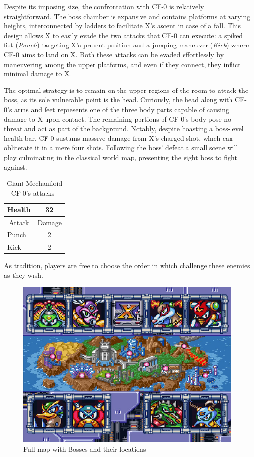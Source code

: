 Despite its imposing size, the confrontation with CF-0 is relatively straightforward. The boss chamber is expansive and contains platforms at varying heights, interconnected by ladders to facilitate X's ascent in case of a fall. This design allows X to easily evade the two attacks that CF-0 can execute: a spiked fist (\emph{Punch}) targeting X's present position and a jumping maneuver (\emph{Kick}) where CF-0 aims to land on X. Both these attacks can be evaded effortlessly by maneuvering among the upper platforms, and even if they connect, they inflict minimal damage to X.

The optimal strategy is to remain on the upper regions of the room to attack the boss, as its sole vulnerable point is the head. Curiously, the head along with CF-0's arms and feet represents one of the three body parts capable of causing damage to X upon contact. The remaining portions of CF-0's body pose no threat and act as part of the background. Notably, despite boasting a boss-level health bar, CF-0 sustains massive damage from X's charged shot, which can obliterate it in a mere four shots. Following the boss' defeat a small scene will play culminating in the classical world map, presenting the eight boss to fight against.

\begin{table}[htp]
	\centering
	\begin{tabular}[h]{l c}
		\toprule
		\multicolumn{1}{c}{Health}  & 32\\
		\midrule
		\multicolumn{1}{c}{Attack} & \multicolumn{1}{c}{Damage}\\
		Punch & 2 \\
		Kick & 2 \\
		\bottomrule
	\end{tabular}
	\caption{Giant Mechaniloid CF-0's attacks~\cite{wiki:CF-0,book,book:Compendium}}
\end{table}

 As tradition, players are free to choose the order in which challenge these enemies as they wish.
\begin{figure}[htp]
	\centering
	\includegraphics[width=0.5\linewidth]{figures/X2/map.png}
	\caption{Full map with Bosses and their locations}
\end{figure}


